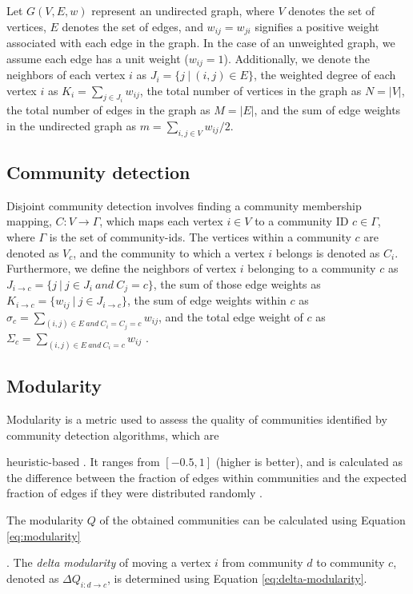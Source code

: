 Let $G(V, E, w)$ represent an undirected graph, where $V$ denotes the set of vertices, $E$ denotes the set of edges, and $w_{ij} = w_{ji}$ signifies a positive weight associated with each edge in the graph. In the case of an unweighted graph, we assume each edge has a unit weight ($w_{ij} = 1$). Additionally, we denote the neighbors of each vertex $i$ as $J_i = \{j\ |\ (i, j) \in E\}$, the weighted degree of each vertex $i$ as $K_i = \sum_{j \in J_i} w_{ij}$, the total number of vertices in the graph as $N = |V|$, the total number of edges in the graph as $M = |E|$, and the sum of edge weights in the undirected graph as $m = \sum_{i, j \in V} w_{ij}/2$.




\subsection{Community detection}

Disjoint community detection involves finding a community membership mapping, $C: V \rightarrow \Gamma$, which maps each vertex $i \in V$ to a community ID $c \in \Gamma$, where $\Gamma$ is the set of community-ids. The vertices within a community $c$ are denoted as $V_c$, and the community to which a vertex $i$ belongs is denoted as $C_i$. Furthermore, we define the neighbors of vertex $i$ belonging to a community $c$ as $J_{i \rightarrow c} = \{j\ |\ j \in J_i\ and\ C_j = c\}$, the sum of those edge weights as $K_{i \rightarrow c} = \{w_{ij}\ |\ j \in J_{i \rightarrow c}\}$, the sum of edge weights within $c$ as $\sigma_c = \sum_{(i, j) \in E\ and\ C_i = C_j = c} w_{ij}$, and the total edge weight of $c$ as $\Sigma_c = \sum_{(i, j) \in E\ and\ C_i = c} w_{ij}$ \cite{com-zarayeneh21}.




\subsection{Modularity}

Modularity is a metric used to assess the quality of communities identified by community detection algorithms, which are heuristic-based \cite{com-newman04}. It ranges from $[-0.5, 1]$ (higher is better), and is calculated as the difference between the fraction of edges within communities and the expected fraction of edges if they were distributed randomly \cite{com-brandes07}. The modularity $Q$ of the obtained communities can be calculated using Equation \ref{eq:modularity}. The \textit{delta modularity} of moving a vertex $i$ from community $d$ to community $c$, denoted as $\Delta Q_{i: d \rightarrow c}$, is determined using Equation \ref{eq:delta-modularity}.


